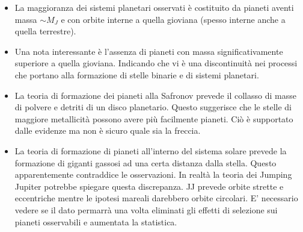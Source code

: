 \documentclass[11pt,a4paper]{article}
\begin{document}
\begin{itemize}
\item La maggioranza dei sistemi planetari osservati è costituito da pianeti aventi massa $\sim M_J$ e con orbite interne a quella gioviana (spesso interne anche a quella terrestre).

\item Una nota interessante è l'assenza di pianeti con massa significativamente superiore a quella gioviana. Indicando che vi è una discontinuità nei processi che portano alla formazione di stelle binarie e di sistemi planetari.

\item La teoria di formazione dei pianeti alla Safronov prevede il collasso di masse di polvere e detriti di un disco planetario. Questo suggerisce che le stelle di maggiore metallicità possono avere più facilmente pianeti. Ciò è supportato dalle evidenze ma non è sicuro quale sia la freccia.

\item La teoria di formazione di pianeti all'interno del sistema solare prevede la formazione di giganti gassosi ad una certa distanza dalla stella. Questo apparentemente contraddice le osservazioni. In realtà la teoria dei Jumping Jupiter potrebbe spiegare questa discrepanza. JJ prevede orbite strette e eccentriche mentre le ipotesi mareali darebbero orbite circolari. E' necessario vedere se il dato permarrà una volta eliminati gli effetti di selezione sui pianeti osservabili e aumentata la statistica.
\end{itemize}
\end{document}
